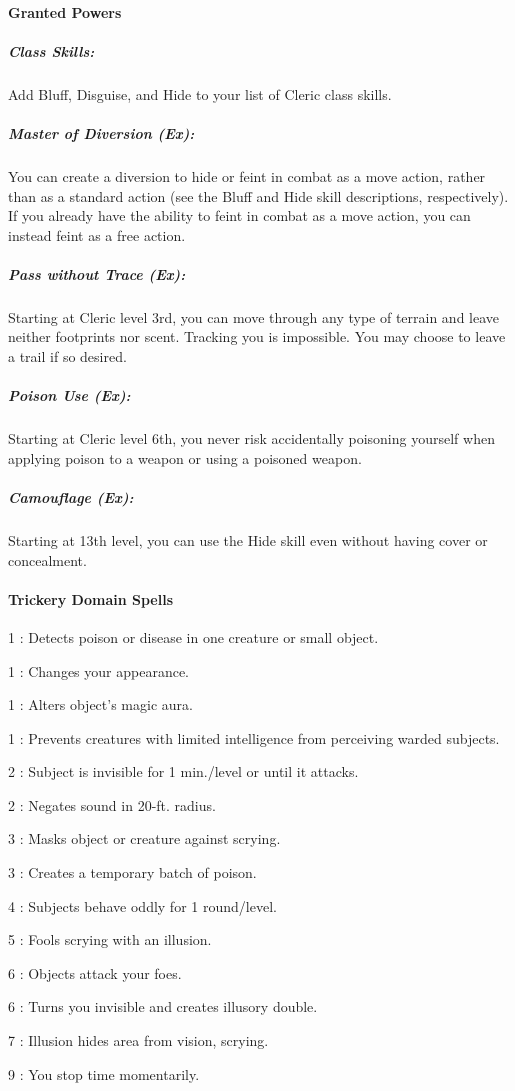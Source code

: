 \paragraph{Granted Powers}
\subparagraph{Class Skills:} Add Bluff, Disguise, and Hide to your list of Cleric class skills.
\subparagraph{Master of Diversion (Ex):}
You can create a diversion to hide or feint in combat as a move action, rather than as a standard action (see the Bluff and Hide skill descriptions, respectively). 
If you already have the ability to feint in combat as a move action, you can instead feint as a free action.
\subparagraph{Pass without Trace (Ex):}
Starting at Cleric level 3rd, you can move through any type of terrain and leave neither footprints nor scent. Tracking you is impossible. You may choose to leave a trail if so desired.
\subparagraph{Poison Use (Ex):}
Starting at Cleric level 6th, you never risk accidentally poisoning yourself when applying poison to a weapon or using a poisoned weapon.
\subparagraph{Camouflage (Ex):}
Starting at 13th level, you can use the Hide skill even without having cover or concealment.
\paragraph{Trickery Domain Spells}
\begin{list}{}{\leftmargin=1em}
\item[1] : Detects poison or disease in one creature or small object.
\item[1] : Changes your appearance.
\item[1] : Alters object's magic aura.
\item[1] : Prevents creatures with limited intelligence from perceiving warded subjects.
\item[2] : Subject is invisible for 1 min./level or until it attacks.
\item[2] : Negates sound in 20-ft. radius.
\item[3] : Masks object or creature against scrying.
\item[3] : Creates a temporary batch of poison.
\item[4] : Subjects behave oddly for 1 round/level.
\item[5] : Fools scrying with an illusion.
\item[6] : Objects attack your foes.
\item[6]  : Turns you invisible and creates illusory double.
\item[7] : Illusion hides area from vision, scrying.
\item[9] : You stop time momentarily.
\end{list}
